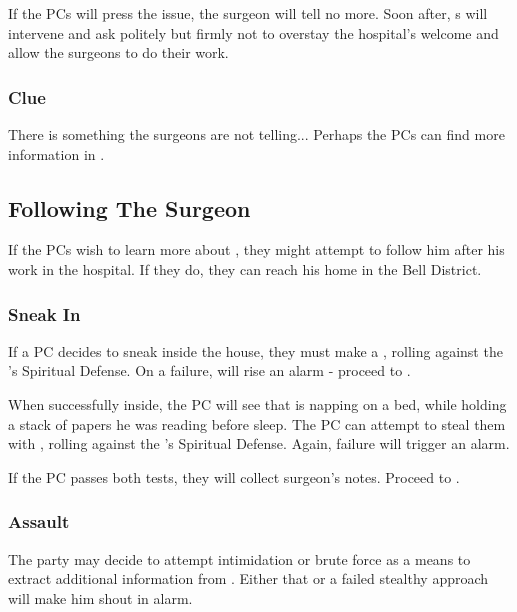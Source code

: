 If the PCs will press the issue, the surgeon will tell no more. Soon after, \enemyDiagramMuscle{}s will intervene and ask politely but firmly not to overstay the hospital's welcome and allow the surgeons to do their work.

\subsubsection{Clue}

There is something the surgeons are not telling... Perhaps the PCs can find more information in  .



\subsection{Following The Surgeon}
\label{ssec:cityHospitalFollowSurgeon}

If the PCs wish to learn more about \npcDiagramSurgeon{}, they might attempt to follow him after his work in the hospital. If they do, they can reach his home in the Bell District.

\subsubsection{Sneak In}

If a PC decides to sneak inside the house, they must make a , rolling against the \enemyDiagramSurgeon{}'s Spiritual Defense. On a failure, \npcDiagramSurgeon{} will rise an alarm - proceed to .

When successfully inside, the PC will see that \npcDiagramSurgeon{} is napping on a bed, while holding a stack of papers he was reading before sleep. The PC can attempt to steal them with , rolling against the \enemyDiagramSurgeon{}'s Spiritual Defense. Again, failure will trigger an alarm.

If the PC passes both tests, they will collect surgeon's notes. Proceed to .

\subsubsection{Assault}
\label{ssec:cityHospitalFollowSurgeonAssault}

The party may decide to attempt intimidation or brute force as a means to extract additional information from \npcDiagramSurgeon{}. Either that or a failed stealthy approach will make him shout in alarm.


